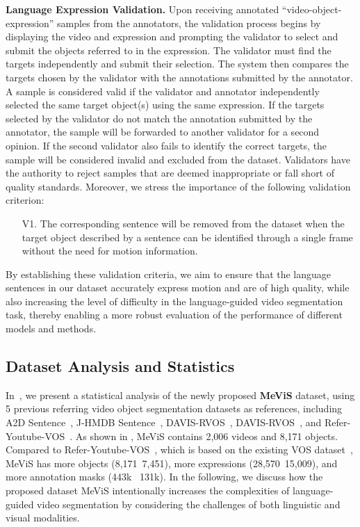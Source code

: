 \documentclass[10pt,twocolumn,letterpaper]{article}
\newcommand{\myparagraph}[1]{{\vspace{.5em} \noindent \bf #1}}
\newcommand{\numvideo}{2,006\xspace}
\newcommand{\numobject}{8,171\xspace}
\newcommand{\numsentence}{28,570\xspace}
\newcommand{\ourdataset}{MeViS\xspace}
\begin{document}
\vspace{-3.6mm}
\myparagraph{Language Expression Validation.} 
Upon receiving annotated ``video-object-expression'' samples from the annotators, the validation process begins by displaying the video and expression and prompting the validator to select and submit the objects referred to in the expression. The validator must find the targets independently and submit their selection. The system then compares the targets chosen by the validator with the annotations submitted by the annotator. A sample is considered valid if the validator and annotator independently selected the same target object(s) using the same expression. If the targets selected by the validator do not match the annotation submitted by the annotator, the sample will be forwarded to another validator for a second opinion. If the second validator also fails to identify the correct targets, the sample will be considered invalid and excluded from the dataset. Validators have the authority to reject samples that are deemed inappropriate or fall short of quality standards. Moreover, we stress the importance of the following validation criterion:
\begin{itemize}
\vspace{-1.6mm}
\item[V1.] The corresponding sentence will be removed from the dataset when the target object described by a sentence can be identified through a single frame without the need for motion information.
\vspace{-1.6mm}
\end{itemize}
By establishing these validation criteria, we aim to ensure that the language sentences in our dataset accurately express motion and are of high quality, while also increasing the level of difficulty in the language-guided video segmentation task, thereby enabling a more robust evaluation of the performance of different models and methods.


\subsection{Dataset Analysis and Statistics}\label{sec:datasetStatistics}

In~, we present a statistical analysis of the newly proposed \textbf{\ourdataset} dataset, using 5 previous referring video object segmentation datasets as references, including A2D Sentence~\cite{gavrilyuk2018actor}, J-HMDB Sentence~\cite{gavrilyuk2018actor}, DAVIS-RVOS~\cite{khoreva2018video}, DAVIS-RVOS~\cite{khoreva2018video}, and Refer-Youtube-VOS~\cite{seo2020urvos}. As shown in , \ourdataset contains \numvideo videos and \numobject objects. Compared to Refer-Youtube-VOS~\cite{seo2020urvos}, which is based on the existing VOS dataset~\cite{xu2018youtube}, \ourdataset has more objects (\numobject \vs~7,451), more expressions (\numsentence \vs~15,009), and more annotation masks (443k \vs~131k). In the following, we discuss how the proposed dataset \ourdataset intentionally increases the complexities of language-guided video segmentation by considering the challenges of both linguistic and visual modalities.
\end{document}
